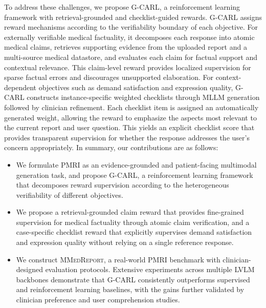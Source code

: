 \documentclass[letterpaper]{article} %
\begin{document}
To address these challenges, we propose G-CARL, a reinforcement learning framework with retrieval-grounded and checklist-guided rewards. 
G-CARL assigns reward mechanisms according to the verifiability boundary of each objective. For externally verifiable medical factuality, it decomposes each response into atomic medical claims, retrieves supporting evidence from the uploaded report and a multi-source medical datastore, and evaluates each claim for factual support and contextual relevance. This claim-level reward provides localized supervision for sparse factual errors and discourages unsupported elaboration.
For context-dependent objectives such as demand satisfaction and expression quality, G-CARL constructs instance-specific weighted checklists through MLLM generation followed by clinician refinement. Each checklist item is assigned an automatically generated weight, allowing the reward to emphasize the aspects most relevant to the current report and user question. This yields an explicit checklist score that provides transparent supervision for whether the response addresses the user's concern appropriately.
In summary, our contributions are as follows:
\begin{itemize}

\item We formulate PMRI as an evidence-grounded and patient-facing multimodal generation task, and propose G-CARL, a reinforcement learning framework that decomposes reward supervision according to the heterogeneous verifiability of different objectives.

\item We propose a retrieval-grounded claim reward that provides fine-grained supervision for medical factuality through atomic claim verification, and a case-specific checklist reward that explicitly supervises demand satisfaction and expression quality without relying on a single reference response.

\item We construct \textsc{MMedReport}, a real-world PMRI benchmark with clinician-designed evaluation protocols. Extensive experiments across multiple LVLM backbones demonstrate that G-CARL consistently outperforms supervised and reinforcement learning baselines, with the gains further validated by clinician preference and user comprehension studies.
\end{itemize}


\end{document}
